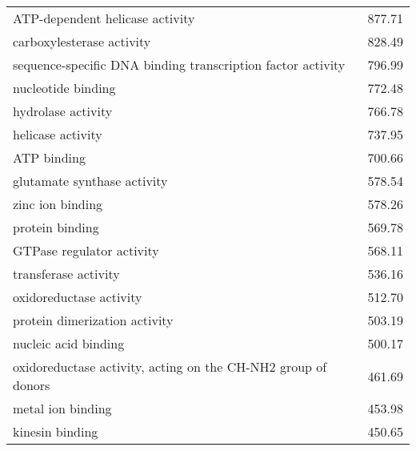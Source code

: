 \begin{table}[hp]
\begin{center}
\begin{tabular}{p{}r}
ATP-dependent helicase activity                               & 877.71                      \\ %
carboxylesterase activity                                     & 828.49                      \\
sequence-specific DNA binding transcription factor activity   & 796.99                      \\ %
nucleotide binding                                            & 772.48                      \\ %
hydrolase activity                                            & 766.78                      \\
helicase activity                                             & 737.95                      \\ %
ATP binding                                                   & 700.66                      \\
glutamate synthase activity                                   & 578.54                      \\
zinc ion binding                                              & 578.26                      \\ %
protein binding                                               & 569.78                      \\
GTPase regulator activity                                     & 568.11                      \\
transferase activity                                          & 536.16                      \\
oxidoreductase activity                                       & 512.70                      \\
protein dimerization activity                                 & 503.19                      \\
nucleic acid binding                                          & 500.17                      \\
oxidoreductase activity, acting on the CH-NH2 group of donors & 461.69                      \\
metal ion binding                                             & 453.98                      \\
kinesin binding                                               & 450.65                      \\ %

\end{tabular}
\end{center}
\end{table}
